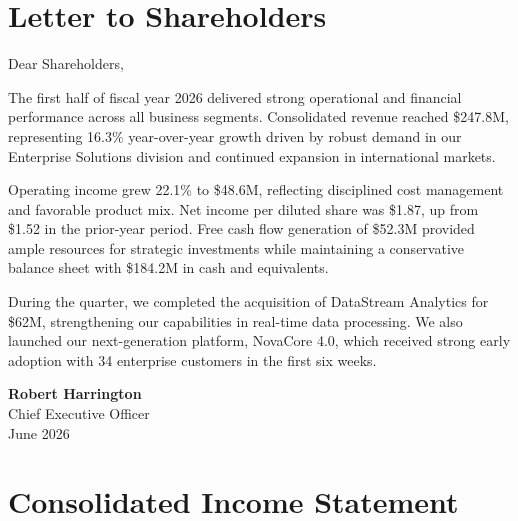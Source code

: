 \documentclass[
    language=english,
    doctype=financial-report,
    institution=none,
]{../../omnilatex}
\begin{document}
\maketitle

\section*{Letter to Shareholders}

Dear Shareholders,

The first half of fiscal year 2026 delivered strong operational and financial
performance across all business segments. Consolidated revenue reached
\$247.8M, representing 16.3\% year-over-year growth driven by robust demand
in our Enterprise Solutions division and continued expansion in international
markets.

Operating income grew 22.1\% to \$48.6M, reflecting disciplined cost
management and favorable product mix. Net income per diluted share was \$1.87,
up from \$1.52 in the prior-year period. Free cash flow generation of
\$52.3M provided ample resources for strategic investments while maintaining
a conservative balance sheet with \$184.2M in cash and equivalents.

During the quarter, we completed the acquisition of DataStream Analytics for
\$62M, strengthening our capabilities in real-time data processing. We also
launched our next-generation platform, NovaCore 4.0, which received strong
early adoption with 34 enterprise customers in the first six weeks.

\vspace{1em}
\noindent\textbf{Robert Harrington}\\
Chief Executive Officer\\
June 2026

\section{Consolidated Income Statement}
\end{document}
